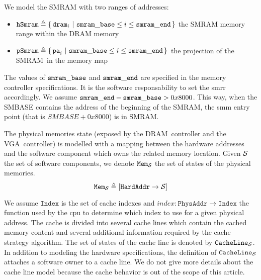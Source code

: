 We model the SMRAM with two ranges of addresses:
%
\begin{itemize}
\item
  $\texttt{hSmram} \triangleq \{\,\mathtt{dram}_i\ |\ \mathtt{smram\_base} \leq i \le
    \mathtt{smram\_end}\,\}$ the SMRAM memory range within the DRAM memory
%
\item
  $\texttt{pSmram} \triangleq \{\,\mathtt{pa}_i\ |\ \mathtt{smram\_base} \leq i \le
    \mathtt{smram\_end}\,\}$ the projection of the SMRAM in the memory map
\end{itemize}

The values of $\mathtt{smram\_base}$ and $\mathtt{smram\_end}$ are specified in the
memory controller specifications.
%
It is the software responsability to set the \ac{smrr} accordingly.
%
We assume $\mathtt{smram\_end} - \mathtt{smram\_base} > 0x8000$.  This way, when the
SMBASE contains the address of the beginning of the SMRAM, the \ac{smm} entry
point (that is $SMBASE + 0x8000$) is in SMRAM.

The physical memories state (exposed by the DRAM controller and the
VGA controller) is modelled with a mapping between the hardware addresses and
the software component which owns the related memory location.
%
Given $\mathcal{S}$ the set of software components, we denote
$\texttt{Mem}_{\mathcal{S}}$ the set of states of the physical memories.
\[
  \texttt{Mem}_{\mathcal{S}} \triangleq [ \texttt{HardAddr} \rightarrow \mathcal{S} ]
\]

We assume $\texttt{Index}$ is the set of cache indexes and
$index : \texttt{PhysAddr} \rightarrow \texttt{Index}$ the function used by the
\ac{cpu} to determine which index to use for a given physical address.
%
The cache is divided into several cache lines which contain the cached memory
content and several additional information required by the cache strategy
algorithm.
%
The set of states of the cache line is denoted by
$\texttt{CacheLine}_{\mathcal{S}}$.
%
In addition to modeling the hardware specifications, the definition of
$\texttt{CacheLine}_{\mathcal{S}}$ attaches a software owner to a cache line.
%
We do not give more details about the cache line model because the cache
behavior is out of the scope of this article.

